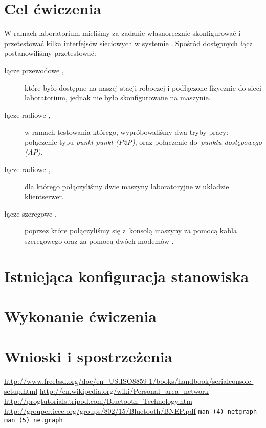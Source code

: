 \documentclass[a4paper,11pt,notitlepage]{article}
\begin{document}

\maketitle
\tableofcontents


\section{Cel ćwiczenia}

W ramach laboratorium mieliśmy za zadanie własnoręcznie skonfigurować i
przetestować kilka interfejsów sieciowych w systemie \bsd. Spośród dostępnych
łącz postanowiliśmy przetestować:

\begin{description}
    \item[łącze przewodowe \eth\textnormal{,}] które było dostępne na naszej
    stacji roboczej i podłączone fizycznie do sieci laboratorium, jednak nie
    było skonfigurowane na maszynie.
    \item[łącze radiowe \wifi\textnormal{,}] w ramach testowania którego,
    wypróbowaliśmy dwa tryby pracy: połączenie typu \emph{punkt-punkt (P2P)},
    oraz połączenie do~\emph{punktu dostępowego (AP)}.
    \item[łącze radiowe \bt\textnormal{,}] dla którego połączyliśmy dwie
    maszyny laboratoryjne w układzie klient\dywiz serwer.
    \item[łącze szeregowe \rs\textnormal{,}] poprzez które połączyliśmy się
    z~konsolą maszyny \zielone{} za pomocą kabla szeregowego oraz za pomocą
    dwóch modemów \bt.
\end{description}


\section{Istniejąca konfiguracja stanowiska}


\section{Wykonanie ćwiczenia}





\section{Wnioski i spostrzeżenia}


\begin{thebibliography}{9}
        \url{http://www.freebsd.org/doc/en_US.ISO8859-1/books/handbook/serialconsole-setup.html}
        \url{http://en.wikipedia.org/wiki/Personal_area_network}
        \url{http://progtutorials.tripod.com/Bluetooth_Technology.htm}
        \url{http://grouper.ieee.org/groups/802/15/Bluetooth/BNEP.pdf}
        {\texttt{man (4) netgraph}}
        {\texttt{man (5) netgraph}}
\end{thebibliography}
\end{document}
